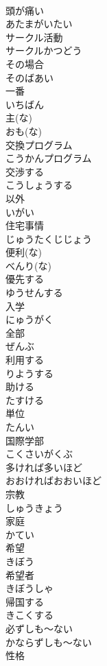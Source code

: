 \documentclass[8pt]{extreport}
\begin{document}
\begin{CJK}{UTF8}{min}
\\	頭が痛い	
\\	あたまがいたい
\\	サークル活動	
\\	サークルかつどう
\\	その場合	
\\	そのばあい
\\	一番	
\\	いちばん
\\	主(な)	
\\	おも(な)
\\	交換プログラム	
\\	こうかんプログラム
\\	交渉する	
\\	こうしょうする
\\	以外	
\\	いがい
\\	住宅事情	
\\	じゅうたくじじょう
\\	便利(な)	
\\	べんり(な)
\\	優先する	
\\	ゆうせんする
\\	入学	
\\	にゅうがく
\\	全部	
\\	ぜんぶ
\\	利用する	
\\	りようする
\\	助ける	
\\	たすける
\\	単位	
\\	たんい
\\	国際学部	
\\	こくさいがくぶ
\\	多ければ多いほど	
\\	おおければおおいほど
\\	宗教	
\\	しゅうきょう
\\	家庭	
\\	かてい
\\	希望	
\\	きぼう
\\	希望者	
\\	きぼうしゃ
\\	帰国する	
\\	きこくする
\\	必ずしも～ない	
\\	かならずしも～ない
\\	性格	

\end{CJK}
\end{document}
